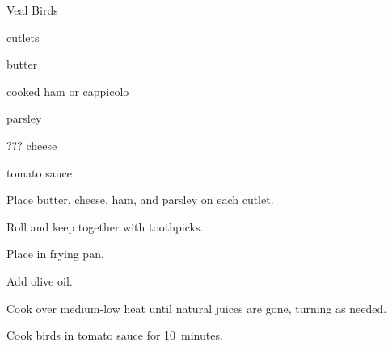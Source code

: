 \begin{recipe}{Veal Birds\FIXME}{}{}

\begin{ingredients}
\item {} cutlets
\item butter
\item {}
\item cooked ham or cappicolo
\item parsley
\item ??? cheese
\item tomato sauce
\end{ingredients}

\begin{directions}
\item Place butter, cheese, ham, and parsley on each cutlet.
\item Roll and keep together with toothpicks.
\item Place in frying pan.
\item Add olive oil.
\item Cook over medium-low heat until natural juices are gone, turning as needed.
\item Cook birds in tomato sauce for 10~minutes.
\end{directions}

\end{recipe}
